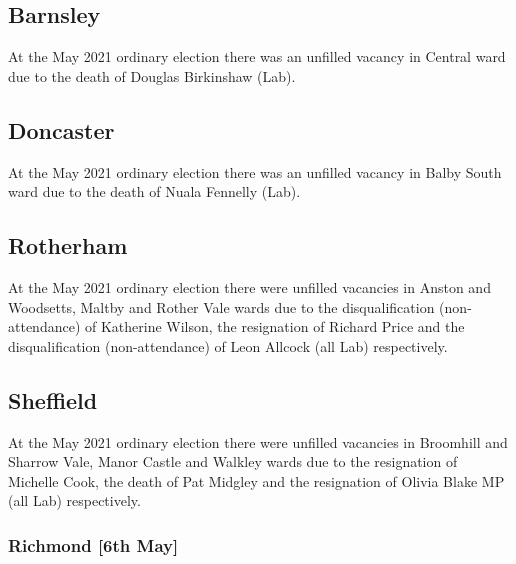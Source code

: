 \documentclass[a4paper,openany]{book}
\begin{document}
\begin{resultsiii}
\subsection*{Barnsley}

At the May 2021 ordinary election there was an unfilled vacancy in Central ward due to the death of Douglas Birkinshaw (Lab).

\subsection*{Doncaster}

At the May 2021 ordinary election there was an unfilled vacancy in Balby South ward due to the death of Nuala Fennelly (Lab).

\subsection*{Rotherham}

At the May 2021 ordinary election there were unfilled vacancies in Anston and Woodsetts, Maltby and Rother Vale wards due to the disqualification (non-attendance) of Katherine Wilson, the resignation of Richard Price and the disqualification (non-attendance) of Leon Allcock (all Lab) respectively.

\subsection*{Sheffield}

At the May 2021 ordinary election there were unfilled vacancies in Broomhill and Sharrow Vale, Manor Castle and Walkley wards due to the resignation of Michelle Cook, the death of Pat Midgley and the resignation of Olivia Blake MP (all Lab) respectively.

\subsubsection*{Richmond \hspace*{\fill}\nolinebreak[1]%
	\enspace\hspace*{\fill}
	[6th May]}


\end{resultsiii}
\end{document}

